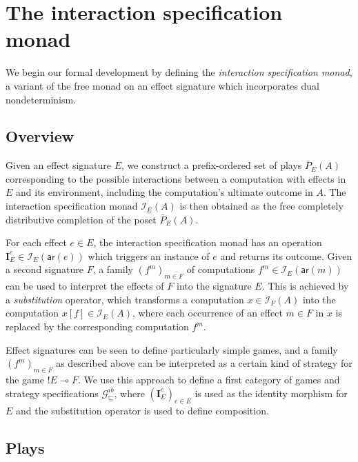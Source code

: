 \documentclass[sigplan,screen]{acmart}
\newcommand{\gcat}{\mathcal{G}_{\sqsubseteq}}
\newcommand{\kw}[1]{\ensuremath{ \mathsf{#1} }}
\begin{document}


\section{The interaction specification monad} \label{sec:intspec} %

We begin our formal development
by defining the \emph{interaction specification monad},
a variant of the free monad on an effect signature which
incorporates dual nondeterminism.

\subsection{Overview} %

Given an effect signature $E$,
we construct a prefix-ordered set of plays $\bar{P}_E(A)$
corresponding to the possible interactions between
a computation with effects in $E$
and its environment,
including the computation's ultimate outcome in $A$.
The interaction specification monad $\mathcal{I}_E(A)$ is then obtained
as the free completely distributive completion of the poset $\bar{P}_E(A)$.

For each effect $e \in E$,
the interaction specification monad
has an operation
$\mathbf{I}_E^e \in \mathcal{I}_E(\kw{ar}(e))$
which triggers an instance of $e$ and returns its outcome.
Given a second signature $F$,
a family $(f^m)_{m \in F}$ of computations
$f^m \in \mathcal{I}_E(\kw{ar}(m))$
can be used to interpret the effects of $F$
into the signature $E$.
This is achieved by a \emph{substitution} operator,
which transforms a computation $x \in \mathcal{I}_F(A)$
into the computation $x[f] \in \mathcal{I}_E(A)$,
where each occurrence of an effect $m \in F$ in $x$
is replaced by the corresponding computation $f^m$.

Effect signatures can be seen to define
particularly simple games,
and a family $(f^m)_{m \in F}$ as described above
can be interpreted as
a certain kind of strategy for the game ${!E} \multimap F$.
We use this approach to define
a first category of games and strategy specifications $\gcat^{ib}$,
where $(\mathbf{I}_E^e)_{e \in E}$ is used as
the identity morphism for $E$ and
the substitution operator is used to define composition.


\subsection{Plays} \label{sec:intm:plays} %
\end{document}
